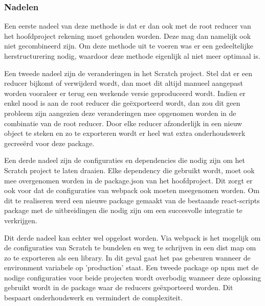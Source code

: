 \subsubsection{Nadelen}
Een eerste nadeel van deze methode is dat er dan ook met de root reducer van het hoofdproject rekening moet gehouden worden. Deze mag dan namelijk ook niet gecombineerd zijn. Om deze methode uit te voeren was er een gedeeltelijke herstructurering nodig, waardoor deze methode eigenlijk al niet meer optimaal is. 

Een tweede nadeel zijn de veranderingen in het Scratch project. Stel dat er een reducer bijkomt of verwijderd wordt, dan moet dit altijd manueel aangepast worden vooraleer er terug een werkende versie geproduceerd wordt. Indien er enkel nood is aan de root reducer die geëxporteerd wordt, dan zou dit geen probleem zijn aangezien deze veranderingen mee opgenomen worden in de combinatie van de root reducer. Door elke reducer afzonderlijk in een nieuw object te steken en zo te exporteren wordt er heel wat extra onderhoudswerk gecreeërd voor deze package.  

Een derde nadeel zijn de configuraties en dependencies die nodig zijn om het Scratch project te laten draaien. 
Elke dependency die gebruikt wordt, moet ook mee overgenomen worden in de package.json van het hoofdproject. Dit zorgt er ook voor dat de configuraties van webpack ook moeten meegenomen worden. Om dit te realiseren werd een nieuwe package gemaakt van de bestaande react-scripts package met de uitbreidingen die nodig zijn om een succesvolle integratie te verkrijgen.

Dit derde nadeel kan echter wel opgelost worden. Via webpack is het mogelijk om de configuraties van Scratch te bundelen en weg te schrijven in een dist map om zo te exporteren als een library. In dit geval gaat het pas gebeuren wanneer de environment variabele op 'production' staat. Een tweede package op npm met de nodige configuraties voor beide projecten wordt overbodig wanneer deze oplossing gebruikt wordt in de package waar de reducers geëxporteerd worden. Dit bespaart onderhoudswerk en vermindert de complexiteit.



